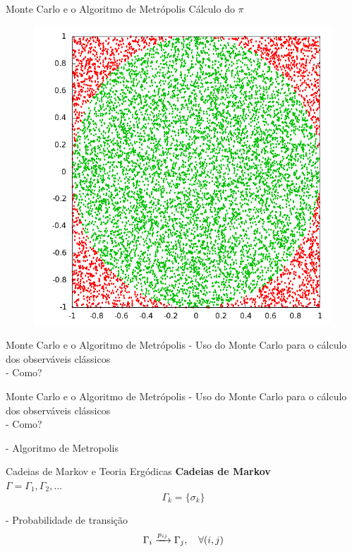 \documentclass[10pt]{beamer}
\begin{document}
\begin{frame}{Monte Carlo e o Algoritmo de Metrópolis}
	Cálculo do $\pi$
	\begin{figure}[h]
		\center
		\includegraphics[scale=.25]{pi.png}
	\end{figure}
\end{frame}

\begin{frame}{Monte Carlo e o Algoritmo de Metrópolis}
	- Uso do Monte Carlo para o cálculo dos observáveis clássicos \\
	- Como?
	
\end{frame}

\begin{frame}{Monte Carlo e o Algoritmo de Metrópolis}
	- Uso do Monte Carlo para o cálculo dos observáveis clássicos \\
	- Como?

	\vspace*{1cm}
	- Algoritmo de Metropolis	
\end{frame}

\begin{frame}{Cadeias de Markov e Teoria Ergódicas}
	\textbf{Cadeias de Markov}\\
	
	$\Gamma = \Gamma_1, \Gamma_2, ...$
	\begin{equation*}
		\Gamma_k = \{ \sigma_k \}
	\end{equation*}
	
	- Probabilidade de transição
	\begin{equation*}
		\Gamma_i \xrightarrow[]{ p_{ij} } \Gamma_j \qc \forall (i, j)
	\end{equation*}
\end{frame}
\end{document}
